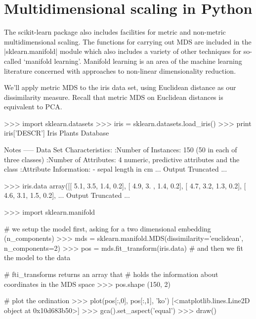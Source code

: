 \section{Multidimensional scaling in Python}

The scikit-learn package also includes facilities for metric and non-metric multidimensional scaling.  The functions for carrying out MDS are included in the |sklearn.manifold| module which also includes a variety of other techniques for so-called `manifold learning'.  Manifold learning is an area of the machine learning literature concerned with approaches to non-linear dimensionality reduction.

We'll apply metric MDS to the iris data set, using Euclidean distance as our dissimilarity measure.  Recall that metric MDS on Euclidean distances is equivalent to PCA.
%
\begin{python}
>>> import sklearn.datasets
>>> iris = sklearn.datasets.load_iris()
>>> print iris['DESCR']
Iris Plants Database

Notes
-----
Data Set Characteristics:
    :Number of Instances: 150 (50 in each of three classes)
    :Number of Attributes: 4 numeric, predictive attributes and the class
    :Attribute Information:
        - sepal length in cm
... Output Truncated ...

>>> iris.data
array([[ 5.1,  3.5,  1.4,  0.2],
       [ 4.9,  3. ,  1.4,  0.2],
       [ 4.7,  3.2,  1.3,  0.2],
       [ 4.6,  3.1,  1.5,  0.2],
... Output Truncated ...

>>> import sklearn.manifold

# we setup the model first, asking for a two dimensional embedding (n_components)
>>> mds = sklearn.manifold.MDS(dissimilarity='euclidean', n_components=2)  
>>> pos = mds.fit_transform(iris.data)  # and then we fit the model to the data

# fti_transforms returns an array that
# holds the information about coordinates in the MDS space
>>> pos.shape
(150, 2)

# plot the ordination
>>> plot(pos[:,0], pos[:,1], 'ko')
[<matplotlib.lines.Line2D object at 0x10d683b50>]
>>> gca().set_aspect('equal')
>>> draw()
\end{python}



